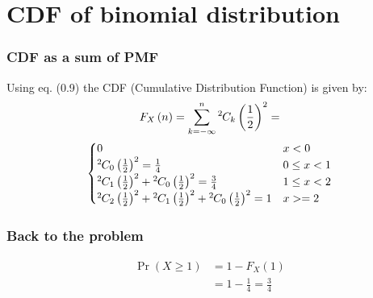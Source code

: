 \documentclass{beamer}
\providecommand{\pr}[1]{\ensuremath{\Pr\left(#1\right)}}
\providecommand{\brak}[1]{\ensuremath{\left(#1\right)}}
\theoremstyle{remark}
\numberwithin{equation}{section}
\begin{document}
\section{CDF of binomial distribution}
\begin{frame}
\frametitle{CDF as a sum of PMF}
Using eq. (0.9) the CDF (Cumulative Distribution Function) is given by:
\begin{multline}
  F_{X}\brak{n}= \sum_{k = -\infty}^n\comb{2}{k}\brak{\frac{1}{2}}^2 =\\ \begin{cases}
    0 & x < 0\\
    \comb{2}{0}\brak{\frac{1}{2}}^2 = \frac{1}{4} & 0 \le x < 1\\
    \comb{2}{1}\brak{\frac{1}{2}}^2 + \comb{2}{0}\brak{\frac{1}{2}}^2 = \frac{3}{4}& 1 \le x < 2\\
    \comb{2}{2}\brak{\frac{1}{2}}^2 + \comb{2}{1}\brak{\frac{1}{2}}^2 + \comb{2}{0}\brak{\frac{1}{2}}^2 = 1 & x >=2\\
  \end{cases}
\end{multline}
\end{frame}
\begin{frame}
\frametitle{Back to the problem}
\begin{align}
  \pr{X \ge 1} &= 1 - F_X\brak{1}\\
  &= 1 - \frac{1}{4} = \frac{3}{4}
\end{align}
\end{frame}
\end{document}

